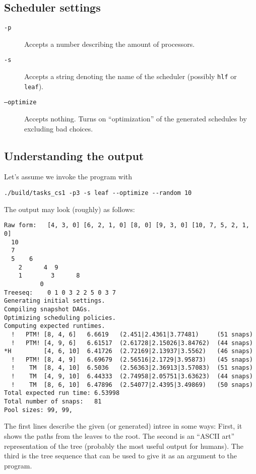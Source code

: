 \documentclass[usletter]{article}
\begin{document}
\subsection{Scheduler settings}

\begin{description}
\item[\texttt{-p}] Accepts a number describing the amount of processors.
\item[\texttt{-s}] Accepts a string denoting the name of the scheduler (possibly \texttt{hlf} or \texttt{leaf}).
\item[\texttt{--optimize}] Accepts nothing. Turns on ``optimization'' of the generated schedules by excluding bad choices.
\end{description}

\subsection{Understanding the output}

Let's assume we invoke the program with
\begin{verbatim}
./build/tasks_cs1 -p3 -s leaf --optimize --random 10
\end{verbatim}

The output may look (roughly) as follows:

\begin{verbatim}
Raw form:	[4, 3, 0] [6, 2, 1, 0] [8, 0] [9, 3, 0] [10, 7, 5, 2, 1, 0]
  10                 
  7                  
  5    6             
    2      4  9      
    1        3      8
          0          
Treeseq:	0 1 0 3 2 2 5 0 3 7 
Generating initial settings.
Compiling snapshot DAGs.
Optimizing scheduling policies.
Computing expected runtimes.
  !   PTM! [8, 4, 6]   6.6619   (2.451|2.4361|3.77481)     (51 snaps)
  !   PTM! [4, 9, 6]   6.61517  (2.61728|2.15026|3.84762)  (44 snaps)
*H         [4, 6, 10]  6.41726  (2.72169|2.13937|3.5562)   (46 snaps)
  !   PTM! [8, 4, 9]   6.69679  (2.56516|2.1729|3.95873)   (45 snaps)
  !    TM  [8, 4, 10]  6.5036   (2.56363|2.36913|3.57083)  (51 snaps)
  !    TM  [4, 9, 10]  6.44333  (2.74958|2.05751|3.63623)  (44 snaps)
  !    TM  [8, 6, 10]  6.47896  (2.54077|2.4395|3.49869)   (50 snaps)
Total expected run time: 6.53998
Total number of snaps:   81
Pool sizes: 99, 99,
\end{verbatim}

The first lines describe the given (or generated) intree in some ways: First, it shows the paths from the leaves to the root. The second is an ``ASCII art'' representation of the tree (probably the most useful output for humans). The third is the tree sequence that can be used to give it as an argument to the program.
\end{document}
